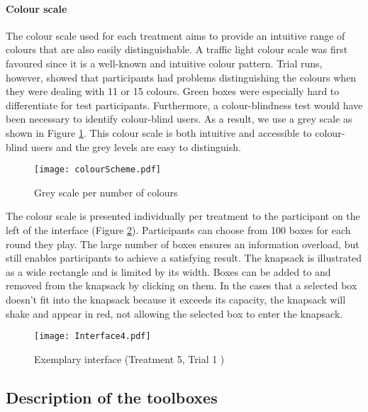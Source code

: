\paragraph{Colour scale}
The colour scale used for each treatment aims to provide an intuitive range of colours that are also easily distinguishable. A traffic light colour scale was first favoured  since it is a well-known and intuitive colour pattern. Trial runs, however, showed that participants had problems distinguishing the colours when they were dealing with 11 or 15 colours. Green boxes were especially hard to differentiate for test participants. Furthermore, a colour-blindness test would have been necessary to identify colour-blind users.
As a result, we use a grey scale as shown in Figure \ref{fig:colourScheme}. This colour scale is both intuitive and accessible to colour-blind users and the grey levels are easy to distinguish.\\
\begin{figure}[htp] %
\begin{center}
  \texttt{[image: colourScheme.pdf]}
\caption{Grey scale per number of colours}
\label{fig:colourScheme}
\end{center}
\end{figure} 

The colour scale is presented individually per treatment to the participant on the left of the interface (Figure \ref{fig:Interface}).
Participants can choose from 100 boxes for each round they play. The large number of boxes ensures an information overload, but still enables participants to achieve a satisfying result. The knapsack is illustrated as a wide rectangle and is limited by its width. Boxes can be added to and removed from the knapsack by clicking on them. In the cases that a selected box doesn't fit into the knapsack because it exceeds its capacity, the knapsack will shake and appear in red, not allowing the selected box to enter the knapsack. 
 \begin{figure}[htp] %
\begin{center} %
  \texttt{[image: Interface4.pdf]}
\caption{Exemplary interface (Treatment 5, Trial 1 )}
\end{center}
\label{fig:Interface}
\end{figure} 
\subsection{Description of the toolboxes}

